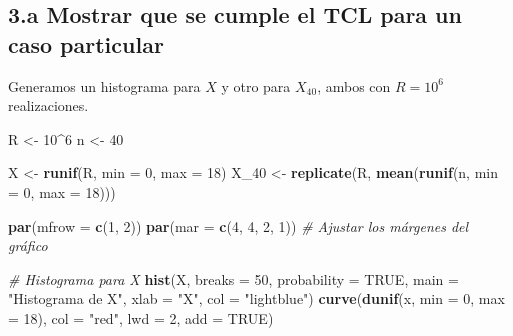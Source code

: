 \documentclass[
]{article}
\newenvironment{Shaded}{\begin{snugshade}}{\end{snugshade}}
\newcommand{\AttributeTok}[1]{\textcolor[rgb]{0.13,0.29,0.53}{#1}}
\newcommand{\CommentTok}[1]{\textcolor[rgb]{0.56,0.35,0.01}{\textit{#1}}}
\newcommand{\ConstantTok}[1]{\textcolor[rgb]{0.56,0.35,0.01}{#1}}
\newcommand{\DecValTok}[1]{\textcolor[rgb]{0.00,0.00,0.81}{#1}}
\newcommand{\FunctionTok}[1]{\textcolor[rgb]{0.13,0.29,0.53}{\textbf{#1}}}
\newcommand{\NormalTok}[1]{#1}
\newcommand{\OtherTok}[1]{\textcolor[rgb]{0.56,0.35,0.01}{#1}}
\newcommand{\SpecialCharTok}[1]{\textcolor[rgb]{0.81,0.36,0.00}{\textbf{#1}}}
\newcommand{\StringTok}[1]{\textcolor[rgb]{0.31,0.60,0.02}{#1}}
\begin{document}
\subsection{3.a Mostrar que se cumple el TCL para un caso
particular}\label{a-mostrar-que-se-cumple-el-tcl-para-un-caso-particular}

Generamos un histograma para \(X\) y otro para \(X_{40}\), ambos con
\(R = 10^6\) realizaciones.

\begin{Shaded}
\begin{Highlighting}[]
\NormalTok{R }\OtherTok{\textless{}{-}} \DecValTok{10}\SpecialCharTok{\^{}}\DecValTok{6}
\NormalTok{n }\OtherTok{\textless{}{-}} \DecValTok{40}

\NormalTok{X }\OtherTok{\textless{}{-}} \FunctionTok{runif}\NormalTok{(R, }\AttributeTok{min =} \DecValTok{0}\NormalTok{, }\AttributeTok{max =} \DecValTok{18}\NormalTok{)}
\NormalTok{X\_40 }\OtherTok{\textless{}{-}} \FunctionTok{replicate}\NormalTok{(R, }\FunctionTok{mean}\NormalTok{(}\FunctionTok{runif}\NormalTok{(n, }\AttributeTok{min =} \DecValTok{0}\NormalTok{, }\AttributeTok{max =} \DecValTok{18}\NormalTok{)))}

\FunctionTok{par}\NormalTok{(}\AttributeTok{mfrow =} \FunctionTok{c}\NormalTok{(}\DecValTok{1}\NormalTok{, }\DecValTok{2}\NormalTok{))}
\FunctionTok{par}\NormalTok{(}\AttributeTok{mar =} \FunctionTok{c}\NormalTok{(}\DecValTok{4}\NormalTok{, }\DecValTok{4}\NormalTok{, }\DecValTok{2}\NormalTok{, }\DecValTok{1}\NormalTok{))  }\CommentTok{\# Ajustar los márgenes del gráfico}

\CommentTok{\# Histograma para X}
\FunctionTok{hist}\NormalTok{(X, }\AttributeTok{breaks =} \DecValTok{50}\NormalTok{, }\AttributeTok{probability =} \ConstantTok{TRUE}\NormalTok{, }\AttributeTok{main =} \StringTok{"Histograma de X"}\NormalTok{, }\AttributeTok{xlab =} \StringTok{"X"}\NormalTok{, }\AttributeTok{col =} \StringTok{"lightblue"}\NormalTok{)}
\FunctionTok{curve}\NormalTok{(}\FunctionTok{dunif}\NormalTok{(x, }\AttributeTok{min =} \DecValTok{0}\NormalTok{, }\AttributeTok{max =} \DecValTok{18}\NormalTok{), }\AttributeTok{col =} \StringTok{"red"}\NormalTok{, }\AttributeTok{lwd =} \DecValTok{2}\NormalTok{, }\AttributeTok{add =} \ConstantTok{TRUE}\NormalTok{)}


\end{Highlighting}
\end{Shaded}
\end{document}
